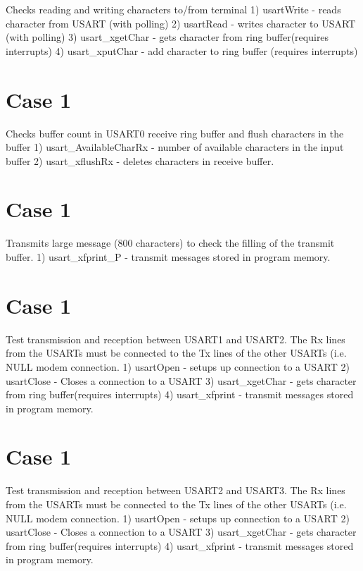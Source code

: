 Checks reading and writing characters to/from terminal 1) usart\+Write -\/ reads character from U\+S\+A\+R\+T (with polling) 2) usart\+Read -\/ writes character to U\+S\+A\+R\+T (with polling) 3) usart\+\_\+xget\+Char -\/ gets character from ring buffer(requires interrupts) 4) usart\+\_\+xput\+Char -\/ add character to ring buffer (requires interrupts)\hypertarget{index_Test}{}\section{Case 1}\label{index_Test}
Checks buffer count in U\+S\+A\+R\+T0 receive ring buffer and flush characters in the buffer 1) usart\+\_\+\+Available\+Char\+Rx -\/ number of available characters in the input buffer 2) usart\+\_\+xflush\+Rx -\/ deletes characters in receive buffer.\hypertarget{index_Test}{}\section{Case 1}\label{index_Test}
Transmits large message (800 characters) to check the filling of the transmit buffer. 1) usart\+\_\+xfprint\+\_\+\+P -\/ transmit messages stored in program memory.\hypertarget{index_Test}{}\section{Case 1}\label{index_Test}
Test transmission and reception between U\+S\+A\+R\+T1 and U\+S\+A\+R\+T2. The Rx lines from the U\+S\+A\+R\+Ts must be connected to the Tx lines of the other U\+S\+A\+R\+Ts (i.\+e. N\+U\+L\+L modem connection. 1) usart\+Open -\/ setups up connection to a U\+S\+A\+R\+T 2) usart\+Close -\/ Closes a connection to a U\+S\+A\+R\+T 3) usart\+\_\+xget\+Char -\/ gets character from ring buffer(requires interrupts) 4) usart\+\_\+xfprint -\/ transmit messages stored in program memory.\hypertarget{index_Test}{}\section{Case 1}\label{index_Test}
Test transmission and reception between U\+S\+A\+R\+T2 and U\+S\+A\+R\+T3. The Rx lines from the U\+S\+A\+R\+Ts must be connected to the Tx lines of the other U\+S\+A\+R\+Ts (i.\+e. N\+U\+L\+L modem connection. 1) usart\+Open -\/ setups up connection to a U\+S\+A\+R\+T 2) usart\+Close -\/ Closes a connection to a U\+S\+A\+R\+T 3) usart\+\_\+xget\+Char -\/ gets character from ring buffer(requires interrupts) 4) usart\+\_\+xfprint -\/ transmit messages stored in program memory. 